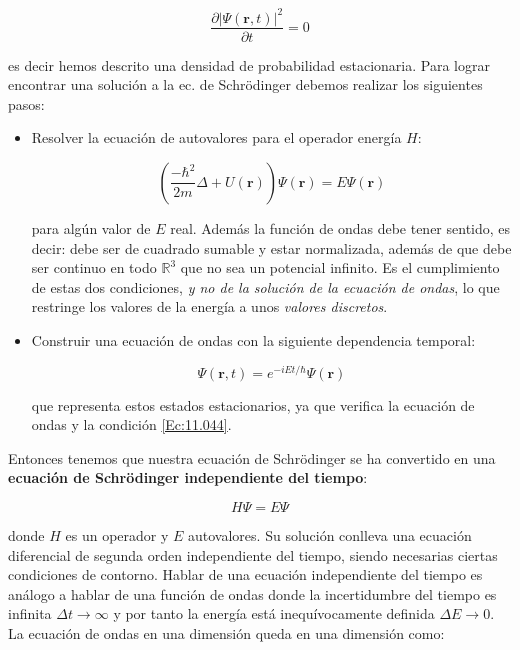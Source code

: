 \documentclass[12pt]{article}
\newcommand{\parentesis}[1]{\left( #1  \right)}
\newcommand{\parciales}[2]{\frac{\partial #1}{\partial #2}}
\newcommand{\rn}{\mathbf{r}}
\begin{document}
\begin{equation}
\parciales{| \Psi (\rn,t)|^2}{t} = 0 \label{Ec:11.044}
\end{equation}

es decir hemos descrito una densidad de probabilidad estacionaria. Para lograr encontrar una solución a la ec. de Schrödinger debemos realizar los siguientes pasos:

\begin{itemize}
\item Resolver la ecuación de autovalores para el operador energía $H$:

\begin{equation}
\parentesis{\dfrac{-\hbar^2}{2m} \Delta + U(\rn)} \Psi (\rn) = E \Psi (\rn)
\end{equation}

para algún valor de $E$ real. Además la función de ondas debe tener sentido, es decir: debe ser de cuadrado sumable y estar normalizada, además de que debe ser continuo en todo $\mathbb{R}^3$ que no sea un potencial infinito. Es el cumplimiento de estas dos condiciones, \textit{y no de la solución de la ecuación de ondas}, lo que restringe los valores de la energía a unos \textit{valores discretos}.

\item Construir una ecuación de ondas con la siguiente dependencia temporal:

\begin{equation}
\Psi (\rn,t) = e^{-i E t/\hbar} \Psi (\rn)
\end{equation}

que representa estos estados estacionarios, ya que verifica la ecuación de ondas y la condición \ref{Ec:11.044}. 

\end{itemize}

Entonces tenemos que nuestra ecuación de Schrödinger se ha convertido en una \textbf{ecuación de Schrödinger independiente del tiempo}:

\begin{equation}
H \Psi = E \Psi
\end{equation}

donde $H$ es un operador y $E$ autovalores. Su solución conlleva una ecuación diferencial de segunda orden independiente del tiempo, siendo necesarias ciertas condiciones de contorno. Hablar de una ecuación independiente del tiempo es análogo a hablar de una función de ondas donde la incertidumbre del tiempo es infinita $\Delta t \rightarrow \infty$ y por tanto la energía está inequívocamente definida $\Delta E \rightarrow 0$. La ecuación de ondas en una dimensión queda en una dimensión como:
\end{document}
